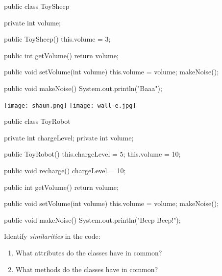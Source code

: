 
\begin{multicols}{2}
\small

\begin{javalst}
public class ToySheep {
    private int volume;

    public ToySheep() {
        this.volume = 3;
    }

    public int getVolume() {
        return volume;
    }

    public void setVolume(int volume) {
        this.volume = volume;
        makeNoise();
    }

    public void makeNoise() {
        System.out.println("Baaa");
    }
}
\end{javalst}

\begin{center}
\texttt{[image: shaun.png]}
\hspace{2em}
\texttt{[image: wall-e.jpg]}
\end{center}

\columnbreak

\begin{javalst}
public class ToyRobot {
    private int chargeLevel;
    private int volume;

    public ToyRobot() {
        this.chargeLevel = 5;
        this.volume = 10;
    }

    public void recharge() {
        chargeLevel = 10;
    }

    public int getVolume() {
        return volume;
    }

    public void setVolume(int volume) {
        this.volume = volume;
        makeNoise();
    }

    public void makeNoise() {
        System.out.println("Beep Beep!");
    }
}
\end{javalst}

\end{multicols}




\Q Identify \emph{similarities} in the code:

\begin{enumerate}
\item What attributes do the classes have in common?
\\[1ex] 

\item What methods do the classes have in common?
\\[1ex] 
\end{enumerate}


